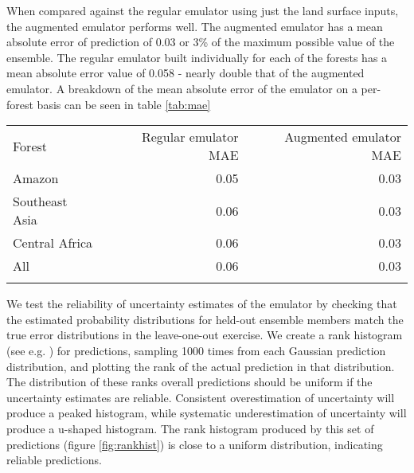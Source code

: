 \documentclass[gmd, manuscript]{copernicus}
\begin{document}
When compared against the regular emulator using just the land surface inputs, the augmented emulator performs well. The augmented emulator has a mean absolute error of prediction of 0.03 or 3\% of the maximum possible value of the ensemble. The regular emulator built individually for each of the forests has a mean absolute error value of 0.058 - nearly double that of the augmented emulator. A breakdown of the mean absolute error of the emulator on a per-forest basis can be seen in table \ref{tab:mae}



\begin{table*}[t]
\caption{Mean absolute error (MAE) rounded to the first significant figure for the regular emulator, using just the seven land surface inputs, and the augmented emulator, including temperature and precipitation.}
\begin{tabular}{lrr}
\tophline

Forest                & Regular emulator MAE & Augmented emulator MAE \\
\middlehline
Amazon              & 0.05                              & 0.03                                     \\
Southeast Asia  & 0.06                               & 0.03                                    \\
Central Africa    & 0.06                               & 0.03                                      \\
All                      & 0.06                              & 0.03                                       \\

\bottomhline
\end{tabular}
\belowtable{} %
\label{tab:mae}
\end{table*}

We test the reliability of uncertainty estimates of the emulator by checking that the estimated probability distributions for held-out ensemble members match the true error distributions in the leave-one-out exercise. We create a rank histogram (see e.g. \cite{hamill2001interpretation}) for predictions, sampling 1000 times from each Gaussian prediction distribution, and plotting the rank of the actual prediction in that distribution. The distribution of these ranks overall predictions should be uniform if the uncertainty estimates are reliable. Consistent overestimation of uncertainty will produce a peaked histogram, while systematic underestimation of uncertainty will produce a u-shaped histogram. The rank histogram produced by this set of predictions (figure \ref{fig:rankhist}) is close to a uniform distribution, indicating reliable predictions.
\end{document}
